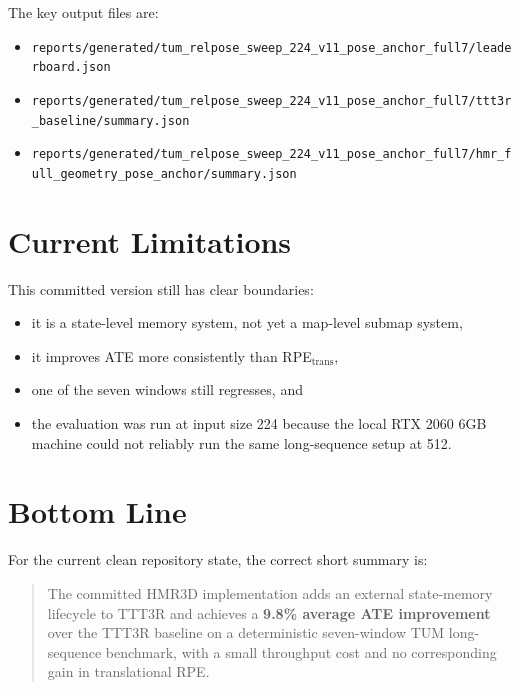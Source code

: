 \documentclass[11pt]{article}
\begin{document}
The key output files are:
\begin{itemize}
\item \texttt{reports/generated/tum\_relpose\_sweep\_224\_v11\_pose\_anchor\_full7/leaderboard.json}
\item \texttt{reports/generated/tum\_relpose\_sweep\_224\_v11\_pose\_anchor\_full7/ttt3r\_baseline/summary.json}
\item \texttt{reports/generated/tum\_relpose\_sweep\_224\_v11\_pose\_anchor\_full7/hmr\_full\_geometry\_pose\_anchor/summary.json}
\end{itemize}

\section{Current Limitations}
This committed version still has clear boundaries:
\begin{itemize}
\item it is a state-level memory system, not yet a map-level submap system,
\item it improves ATE more consistently than RPE$_{\text{trans}}$,
\item one of the seven windows still regresses, and
\item the evaluation was run at input size 224 because the local RTX 2060 6GB
machine could not reliably run the same long-sequence setup at 512.
\end{itemize}

\section{Bottom Line}
For the current clean repository state, the correct short summary is:

\begin{quote}
The committed HMR3D implementation adds an external state-memory lifecycle to
TTT3R and achieves a \textbf{9.8\% average ATE improvement} over the TTT3R
baseline on a deterministic seven-window TUM long-sequence benchmark, with a
small throughput cost and no corresponding gain in translational RPE.
\end{quote}
\end{document}
